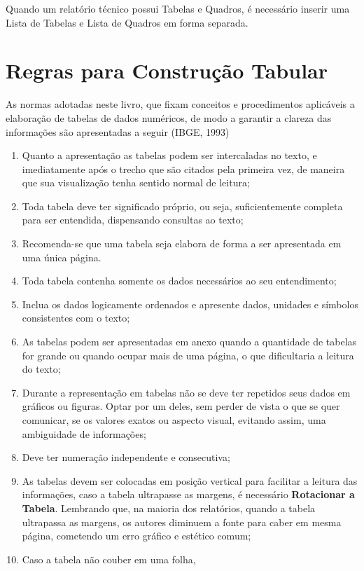 Quando um relatório técnico possui Tabelas e Quadros, é necessário inserir uma Lista de Tabelas e Lista de Quadros em forma separada.


\newpage
\section{Regras para Construção Tabular}

As normas adotadas neste livro, que fixam conceitos e procedimentos aplicáveis a elaboração de tabelas de dados numéricos, de modo a garantir a clareza das informações são apresentadas a seguir (IBGE, 1993)

\begin{enumerate}
\item Quanto a apresentação as tabelas podem ser intercaladas no texto, e imediatamente após o trecho que são citados pela primeira vez, de maneira que sua visualização tenha sentido normal de leitura;  
\item Toda tabela deve ter significado próprio, ou seja, suficientemente completa para ser entendida, dispensando consultas ao texto; 
\item Recomenda-se que uma tabela seja elabora
de forma a ser apresentada em uma única página.
\item Toda tabela contenha somente os dados necessários ao seu entendimento;
\item Inclua os dados logicamente ordenados e apresente dados, unidades e símbolos consistentes com o texto;
\item As tabelas podem ser apresentadas em anexo quando a quantidade de tabelas for grande ou quando ocupar mais de uma página, o que dificultaria a leitura do texto; 
\item Durante a representação em tabelas não se deve ter repetidos seus dados em gráficos ou figuras. Optar por um deles, sem perder de vista o que se quer comunicar, se os valores exatos ou aspecto visual, evitando assim, uma ambiguidade de informações;
\item Deve ter numeração independente e consecutiva; 
\item As tabelas devem ser colocadas em posição vertical para facilitar a leitura das informações, caso a tabela ultrapasse as margens, é necessário \textbf{Rotacionar a Tabela}. Lembrando que, na maioria dos relatórios, quando a tabela ultrapassa as margens, os autores diminuem a fonte para caber em mesma página, cometendo um erro gráfico e estético comum; 
\item Caso a tabela não couber em uma folha,

\end{enumerate}
